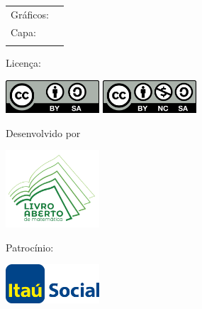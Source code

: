 {\begin{tabular}{p{}p{}}
			\ifdefined\la@graficos
			Gráficos:                                          & \la@graficos                                                            \\
			\else\fi

			\ifdefined\la@autorcapa
			Capa:                                              & \la@autorcapa                                                           \\
			\else\fi
		\end{tabular}

		\vfill

			\begin{minipage}[l]{5cm}
				\centering

				{\large Licença:}

				\vspace{1em}

				\ifdefined\la@ccbysa
					\includegraphics[width=3.5cm]{resources/figures/cc-by-sa1}
				\else
					\includegraphics[width=3.5cm]{resources/figures/cc-by-nc-sa}
				\fi

			\end{minipage}\hfill
			\begin{minipage}[c]{5cm}
				\centering
				{\large Desenvolvido por}

				\vspace{1em}
				\includegraphics[width=3.5cm]{resources/figures/logo-associacao}
			\end{minipage}\hfill
			\begin{minipage}[r]{5cm}
				\centering

				{\large Patrocínio:}

				\vspace{1em}
				\includegraphics[width=3.5cm]{resources/figures/itau}
			\end{minipage}
  \clearpage

    \undef\la@author%
    \undef\la@revisao%
    \revisaofalse%
    \authorsfalse%

    \undef\la@versao
    \undef\la@autorcapa
    \undef\la@graficos
    \undef\la@versaodigital
    \undef\la@ccbysa
}
